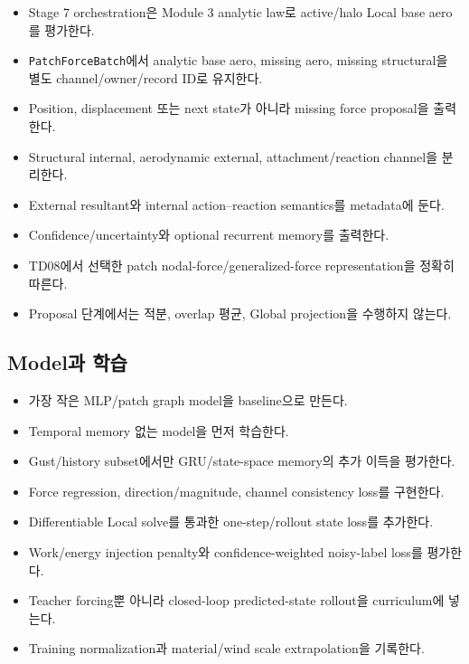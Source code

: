 \documentclass[10pt,a4paper]{article}
\newcommand{\todo}{\textcolor{TodoGray}{\(\square\)}}
\newcommand{\code}[1]{\texttt{#1}}
\begin{document}
\begin{itemize}
  \item[\todo] Stage 7 orchestration은 Module 3 analytic law로 active/halo Local base aero를 평가한다.
  \item[\todo] \code{PatchForceBatch}에서 analytic base aero, missing aero, missing structural을 별도 channel/owner/record ID로 유지한다.
  \item[\todo] Position, displacement 또는 next state가 아니라 missing force proposal을 출력한다.
  \item[\todo] Structural internal, aerodynamic external, attachment/reaction channel을 분리한다.
  \item[\todo] External resultant와 internal action--reaction semantics를 metadata에 둔다.
  \item[\todo] Confidence/uncertainty와 optional recurrent memory를 출력한다.
  \item[\todo] TD08에서 선택한 patch nodal-force/generalized-force representation을 정확히 따른다.
  \item[\todo] Proposal 단계에서는 적분, overlap 평균, Global projection을 수행하지 않는다.
\end{itemize}

\subsection*{Model과 학습}

\begin{itemize}
  \item[\todo] 가장 작은 MLP/patch graph model을 baseline으로 만든다.
  \item[\todo] Temporal memory 없는 model을 먼저 학습한다.
  \item[\todo] Gust/history subset에서만 GRU/state-space memory의 추가 이득을 평가한다.
  \item[\todo] Force regression, direction/magnitude, channel consistency loss를 구현한다.
  \item[\todo] Differentiable Local solve를 통과한 one-step/rollout state loss를 추가한다.
  \item[\todo] Work/energy injection penalty와 confidence-weighted noisy-label loss를 평가한다.
  \item[\todo] Teacher forcing뿐 아니라 closed-loop predicted-state rollout을 curriculum에 넣는다.
  \item[\todo] Training normalization과 material/wind scale extrapolation을 기록한다.
\end{itemize}
\end{document}
